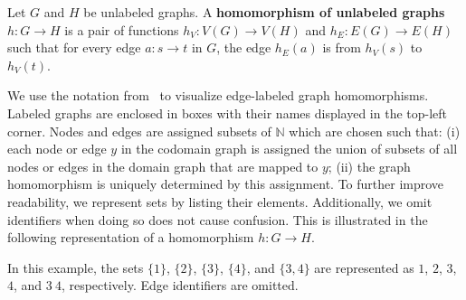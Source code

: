 \begin{definition}
    \label{def:unlabeled_graph:homomorphism}
    Let \( G \) and \( H \) be unlabeled graphs. A \textbf{homomorphism of unlabeled graphs} $h: G \to H$ is a pair of functions $h_V: V(G) \to V(H) $ and $h_E: E(G) \to E(H)$ such that for every edge \( a: s \to t \) in \( G \), the edge \( h_E(a) \) is from \( h_V(s) \) to \( h_V(t) \).
\end{definition}


\begin{notation}
    We use the notation from~\cite[Notation 1]{overbeek2023apbpotutorial} to visualize edge-labeled graph homomorphisms. Labeled graphs are enclosed in boxes with their names displayed in the top-left corner. Nodes
     and edges are assigned subsets of \(\mathbb{N}\) which are chosen such that: (i) each node or edge \( y \) in the codomain graph is assigned the union of subsets of all nodes or edges in the domain graph that are mapped to \( y \); (ii) the graph homomorphism is uniquely determined by this assignment. To further improve readability, we represent sets by listing their elements. Additionally, we omit identifiers when doing so does not cause confusion. This is illustrated in the following representation of a homomorphism \( h: G \to H \).
    
   \begin{center}
    \end{center}  
    In this example, the sets \(\{1\}\), \(\{2\}\), \(\{3\}\), \(\{4\}\), and \(\{3,4\}\) are represented as \(1\), \(2\), \(3\), \(4\), and \(3\ 4\), respectively. Edge identifiers are omitted.
\end{notation}

